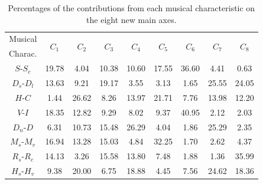 \documentclass[
 aip,
 jmp,
 amsmath,amssymb,
 reprint,
]{revtex4-1}
\begin{document}
\begin{table}[ht]
  \caption{\label{tab:Deviatesmus}Percentages of
    the contributions from each musical characteristic on the eight
    new main axes.}
  \begin{tabular}{|c||c|c|c|c|c|c|c|c|}
    \hline
    Musical         & \multirow{2}{*}{$C_1$} & \multirow{2}{*}{$C_2$} 
    & \multirow{2}{*}{$C_3$} & \multirow{2}{*}{$C_4$} & \multirow{2}{*}{$C_5$}
    & \multirow{2}{*}{$C_6$} & \multirow{2}{*}{$C_7$} & \multirow{2}{*}{$C_8$}
    \\
    Charac. & & & & & & & & \\
    \hline
    $S$-$S_c$   
    &  19.78  &   4.04  & 10.38 & 10.60 &  17.55  &  36.60  &  4.41 &  0.63 \\
    $D_s$-$D_l$            
    &  13.63  &   9.21  & 19.17 &  3.55 &   3.13  &   1.65  & 25.55 & 24.05 \\
    $H$-$C$                
    &   1.44  &  26.62  & 8.26 & 13.97 &  21.71  &   7.76  & 13.98 & 12.20 \\
    $V$-$I$                
    &  18.35  &  12.82  & 9.29 &  8.02 &   9.37  &  40.95  &  2.12 &  2.03 \\
    $D_n$-$D$              
    &   6.31  &  10.73  & 15.48 & 26.29 &  4.04  &   1.86  & 25.29 &  2.35 \\
    $M_s$-$M_v$            
    &  16.94  &  13.28  & 15.03 &  4.84 &  32.25  &  1.70  &  2.62 &  4.37 \\
    $R_s$-$R_c$            
    &  14.13  &   3.26  & 15.58 & 13.80 &   7.48  &  1.88  &  1.36 & 35.99 \\
    $H_s$-$H_v$            
    &   9.38  &  20.00  &  6.75 & 18.88 &   4.45  &  7.56  & 24.62 & 18.36 \\
    \hline
  \end{tabular}
\end{table}
\end{document}
